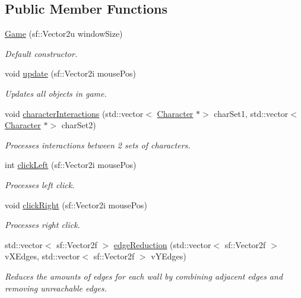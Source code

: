 \subsection*{Public Member Functions}
\begin{DoxyCompactItemize}
\item 
\hyperlink{class_game_ae52380ebfe491f30627f4b334f516c77}{Game} (sf\+::\+Vector2u window\+Size)
\begin{DoxyCompactList}\small\item\em Default constructor. \end{DoxyCompactList}\item 
void \hyperlink{class_game_a5cc8d82415814daa1dd4257c15c88215}{update} (sf\+::\+Vector2i mouse\+Pos)
\begin{DoxyCompactList}\small\item\em Updates all objects in game. \end{DoxyCompactList}\item 
void \hyperlink{class_game_a04c9d598d2fea43a079b95290e305c8f}{character\+Interactions} (std\+::vector$<$ \hyperlink{class_character}{Character} $\ast$$>$ char\+Set1, std\+::vector$<$ \hyperlink{class_character}{Character} $\ast$$>$ char\+Set2)
\begin{DoxyCompactList}\small\item\em Processes interactions between 2 sets of characters. \end{DoxyCompactList}\item 
int \hyperlink{class_game_a70f8b3b5e70a9b768c79e453a3c72642}{click\+Left} (sf\+::\+Vector2i mouse\+Pos)
\begin{DoxyCompactList}\small\item\em Processes left click. \end{DoxyCompactList}\item 
void \hyperlink{class_game_a716af68f70fa3a749663f135940bfa51}{click\+Right} (sf\+::\+Vector2i mouse\+Pos)
\begin{DoxyCompactList}\small\item\em Processes right click. \end{DoxyCompactList}\item 
std\+::vector$<$ sf\+::\+Vector2f $>$ \hyperlink{class_game_aee51d9b94ba43131c09490b7b79f68db}{edge\+Reduction} (std\+::vector$<$ sf\+::\+Vector2f $>$ v\+X\+Edges, std\+::vector$<$ sf\+::\+Vector2f $>$ v\+Y\+Edges)
\begin{DoxyCompactList}\small\item\em Reduces the amounts of edges for each wall by combining adjacent edges and removing unreachable edges. \end{DoxyCompactList}\item 

\end{DoxyCompactItemize}
